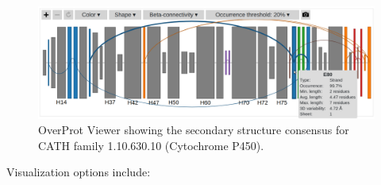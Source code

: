 \documentclass{article}
\begin{document}
\begin{figure}[h!]
  \centering\includegraphics[width=\linewidth]{figures/overprot_viewer.png}
  \caption{OverProt Viewer showing the secondary structure consensus for CATH family 1.10.630.10 (Cytochrome P450).}
  \label{fig:overprot_viewer}
\end{figure}

Visualization options include: 
\end{document}
